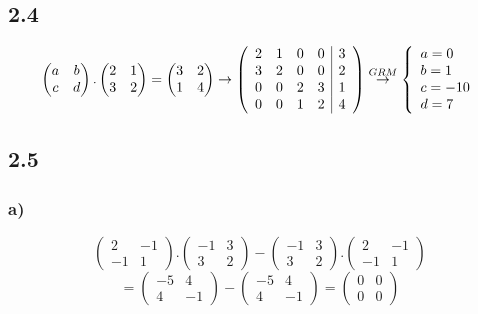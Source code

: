 \documentclass[11pt]{article}
\begin{document}
\subsection*{2.4}
\[
\begin{pmatrix}
a & b \\
c & d
\end{pmatrix}
.
\begin{pmatrix}
2 & 1 \\
3 & 2
\end{pmatrix}
=
\begin{pmatrix}
3 & 2 \\
1 & 4
\end{pmatrix}
\rightarrow
\left(
\begin{array}{cccc|c}
2 & 1 & 0 & 0 & 3\\
3 & 2 & 0 & 0 & 2\\
0 & 0 & 2 & 3 & 1\\
0 & 0 & 1 & 2 & 4
\end{array}
\right)
\overset{GRM}{\rightarrow}
\left\lbrace
\begin{array}{l l}
a=0\\
b=1\\
c=-10\\
d=7
\end{array}
\right.
\]

\subsection*{2.5}
\subsubsection*{a)}
\[
\begin{pmatrix}
2 & -1 \\
-1 & 1
\end{pmatrix}
.
\begin{pmatrix}
-1 & 3 \\
3 & 2
\end{pmatrix}
-
\begin{pmatrix}
-1 & 3 \\
3 & 2
\end{pmatrix}
.
\begin{pmatrix}
2 & -1 \\
-1 & 1
\end{pmatrix}
\]
\[
=
\begin{pmatrix}
-5 & 4 \\
4 & -1
\end{pmatrix}
-
\begin{pmatrix}
-5 & 4 \\
4 & -1
\end{pmatrix}
=
\begin{pmatrix}
0 & 0 \\
0 & 0
\end{pmatrix}
\]
\end{document}
